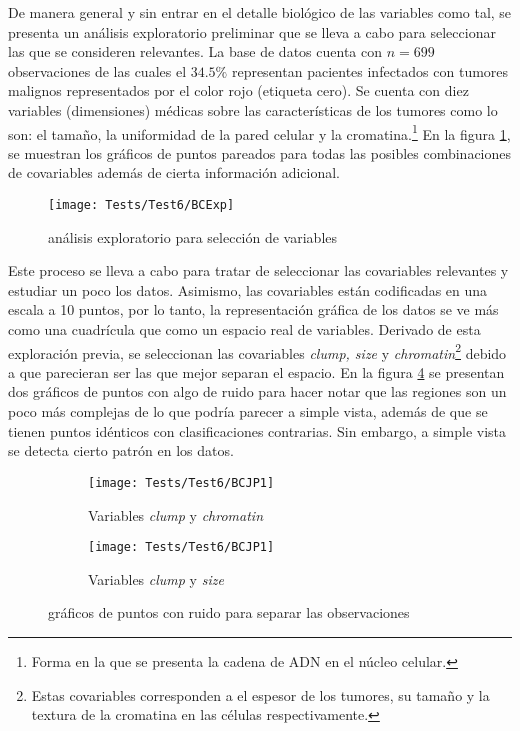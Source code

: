 \documentclass[../Main/Main.tex]{subfiles}
\begin{document}
De manera general y sin entrar en el detalle biológico de las variables como tal, se presenta un análisis exploratorio preliminar que se lleva a cabo para seleccionar las que se consideren relevantes. La base de datos cuenta con $n = 699$ observaciones de las cuales el $34.5\%$ representan pacientes infectados con tumores malignos representados por el color rojo (etiqueta cero). Se cuenta con diez variables (dimensiones) médicas sobre las características de los tumores como lo son: el tamaño, la uniformidad de la pared celular y la cromatina.\footnote{Forma en la que se presenta la cadena de ADN en el núcleo celular.} En la figura \ref{fig:BCExp}, se muestran los gráficos de puntos pareados para todas las posibles combinaciones de covariables además de cierta información adicional.
\begin{figure}[h]
	\centering
	\texttt{[image: Tests/Test6/BCExp]}
	\caption{análisis exploratorio para selección de variables}
	\label{fig:BCExp}
\end{figure}
Este proceso se lleva a cabo para tratar de seleccionar las covariables relevantes y estudiar un poco los datos. Asimismo, las covariables están codificadas en una escala a 10 puntos, por lo tanto, la representación gráfica de los datos se ve más como una cuadrícula que como un espacio real de variables. Derivado de esta exploración previa, se seleccionan las covariables \textit{clump, size} y \textit{chromatin}\footnote{Estas covariables corresponden a el espesor de los tumores, su tamaño y la textura de la cromatina en las células respectivamente.} debido a que parecieran ser las que mejor separan el espacio. En la figura \ref{fig:BCJP} se presentan dos gráficos de puntos con algo de ruido para hacer notar que las regiones son un poco más complejas de lo que podría parecer a simple vista, además de que se tienen puntos idénticos con clasificaciones contrarias. Sin embargo, a simple vista se detecta cierto patrón en los datos.
\begin{figure}[h]
        \centering
        \begin{subfigure}[b]{0.45\textwidth}
            \centering
            \texttt{[image: Tests/Test6/BCJP1]}
            \caption{Variables \textit{clump} y \textit{chromatin}}
			\label{fig:BCJP1}
        \end{subfigure}
        \hfill
        \begin{subfigure}[b]{0.45\textwidth}  
            \centering 
            \texttt{[image: Tests/Test6/BCJP1]}
            \caption{Variables \textit{clump} y \textit{size}}
			\label{fig:BCJP2}
        \end{subfigure}
		\caption{gráficos de puntos con ruido para separar las observaciones}
		\label{fig:BCJP}
\end{figure}
\end{document}

